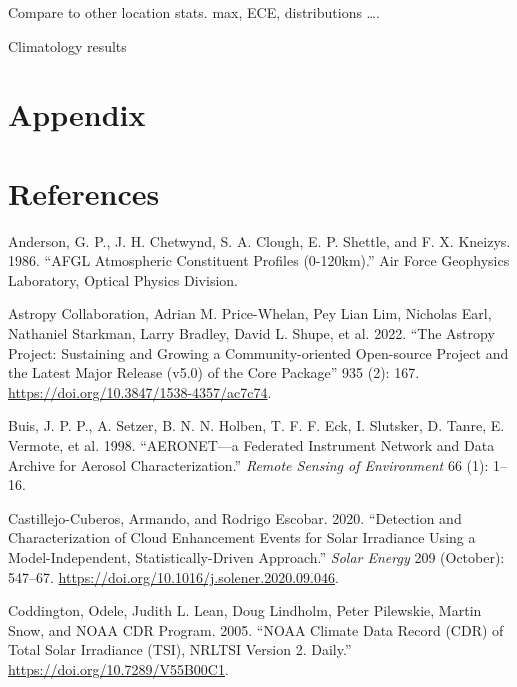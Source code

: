 \documentclass[
]{article}
\newlength{\cslhangindent}
\newlength{\cslentryspacingunit} %
\newenvironment{CSLReferences}[2] %
 {%
  \setlength{\parindent}{0pt}
  \ifodd #1
  \let\oldpar\par
  \def\par{\hangindent=\cslhangindent\oldpar}
  \fi
  \setlength{\parskip}{#2\cslentryspacingunit}
 }%
 {}
\begin{document}
Compare to other location stats.
max, ECE, distributions \ldots.

Climatology results

\hypertarget{appendix}{%
\section*{Appendix}\label{appendix}}

\hypertarget{references}{%
\section*{References}\label{references}}

\hypertarget{refs}{}
\begin{CSLReferences}{1}{0}
\leavevmode{}%
Anderson, G. P., J. H. Chetwynd, S. A. Clough, E. P. Shettle, and F. X. Kneizys. 1986. {``{AFGL} Atmospheric Constituent Profiles (0-120km).''} Air Force Geophysics Laboratory, Optical Physics Division.

\leavevmode{}%
Astropy Collaboration, Adrian M. Price-Whelan, Pey Lian Lim, Nicholas Earl, Nathaniel Starkman, Larry Bradley, David L. Shupe, et al. 2022. {``{The Astropy Project: Sustaining and Growing a Community-oriented Open-source Project and the Latest Major Release (v5.0) of the Core Package}''} 935 (2): 167. \url{https://doi.org/10.3847/1538-4357/ac7c74}.

\leavevmode{}%
Buis, J. P. P., A. Setzer, B. N. N. Holben, T. F. F. Eck, I. Slutsker, D. Tanre, E. Vermote, et al. 1998. {``AERONET---a Federated Instrument Network and Data Archive for Aerosol Characterization.''} \emph{Remote Sensing of Environment} 66 (1): 1--16.

\leavevmode{}%
Castillejo-Cuberos, Armando, and Rodrigo Escobar. 2020. {``Detection and Characterization of Cloud Enhancement Events for Solar Irradiance Using a Model-Independent, Statistically-Driven Approach.''} \emph{Solar Energy} 209 (October): 547--67. \url{https://doi.org/10.1016/j.solener.2020.09.046}.

\leavevmode{}%
Coddington, Odele, Judith L. Lean, Doug Lindholm, Peter Pilewskie, Martin Snow, and NOAA CDR Program. 2005. {``{NOAA} Climate Data Record ({CDR}) of Total Solar Irradiance ({TSI}), {NRLTSI} Version 2. {D}aily.''} \url{https://doi.org/10.7289/V55B00C1}.


\end{CSLReferences}
\end{document}

